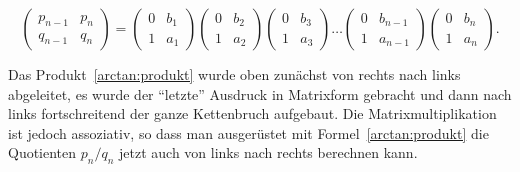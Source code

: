 \begin{refsection}
\begin{equation}
\begin{pmatrix}
p_{n-1}&p_n\\
q_{n-1}&q_n
\end{pmatrix}
=
\begin{pmatrix} 0&b_1\\1&a_1\end{pmatrix}
\begin{pmatrix} 0&b_2\\1&a_2\end{pmatrix}
\begin{pmatrix} 0&b_3\\1&a_3\end{pmatrix}
\dots
\begin{pmatrix} 0&b_{n-1}\\1&a_{n-1}\end{pmatrix}
\begin{pmatrix} 0&b_n\\1&a_n\end{pmatrix}.
\label{arctan:produkt}
\end{equation}

Das Produkt~\eqref{arctan:produkt} wurde oben zunächst von rechts nach links
abgeleitet, es wurde der ``letzte'' Ausdruck in Matrixform gebracht und
dann nach links fortschreitend der ganze Kettenbruch aufgebaut.
Die Matrixmultiplikation ist jedoch assoziativ, so dass man ausgerüstet
mit Formel~\eqref{arctan:produkt} die Quotienten $p_n/q_n$ jetzt auch von
links nach rechts berechnen kann.


\end{refsection}
